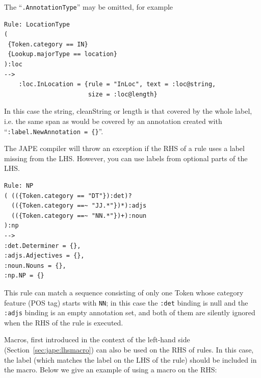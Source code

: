 The ``\verb|.AnnotationType|'' may be omitted, for example
%
\begin{small}
\begin{verbatim}
Rule: LocationType
(
 {Token.category == IN}
 {Lookup.majorType == location}
):loc
-->
    :loc.InLocation = {rule = "InLoc", text = :loc@string,
                       size = :loc@length}
\end{verbatim}
\end{small}

In this case the string, cleanString or length is that covered by the whole
label, i.e. the same span as would be covered by an annotation created with
``\verb|:label.NewAnnotation = {}|''.

The JAPE compiler will throw an exception if the RHS of a rule uses a label
missing from the LHS.  However, you can use labels from optional parts of the
LHS.
\begin{small}
\begin{verbatim}
Rule: NP
( (({Token.category == "DT"}):det)?
  (({Token.category ==~ "JJ.*"})*):adjs
  (({Token.category ==~ "NN.*"})+):noun
):np
-->
:det.Determiner = {},
:adjs.Adjectives = {},
:noun.Nouns = {},
:np.NP = {}
\end{verbatim}
\end{small}
This rule can match a sequence consisting of only one Token whose category
feature (POS tag) starts with \verb!NN!; in this case the \verb!:det! binding is
null and the \verb!:adjs! binding is an empty annotation set, and both of them
are silently ignored when the RHS of the rule is executed.

Macros, first introduced in the context of the left-hand side
(Section~\ref{sec:jape:lhsmacro}) can also be used on the RHS of rules. In this
case, the label (which matches the label on the LHS of the rule) should be
included in the macro.  Below we give an example of using a macro on the RHS:

